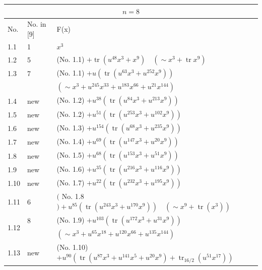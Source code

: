 \documentclass[10pt]{article}
\begin{document}
\begin{table}[h]
\begin{center}
\begin{tabular}{|l|l|l|}
\hline
\multicolumn{3}{|c|}{$n=8$} \\
\hline
No. & No. in [9] & F(x) \\
\hline
1.1 & 1 & $x^{3}$ \\
\hline
1.2 & 5 & (No. 1.1) $+\operatorname{tr}\left(u^{48} x^{3}+x^{9}\right) \quad\left(\sim x^{3}+\operatorname{tr} x^{9}\right)$ \\
\hline
1.3 & 7 & (No. 1.1) $+u\left(\operatorname{tr}\left(u^{63} x^{3}+u^{252} x^{9}\right)\right)$ \\
\hline
 &  & $\left(\sim x^{3}+u^{245} x^{33}+u^{183} x^{66}+u^{21} x^{144}\right)$ \\
\hline
1.4 & new & (No. 1.2) $+u^{38}\left(\operatorname{tr}\left(u^{84} x^{3}+u^{213} x^{9}\right)\right)$ \\
\hline
1.5 & new & (No. 1.2) $+u^{51}\left(\operatorname{tr}\left(u^{253} x^{3}+u^{102} x^{9}\right)\right)$ \\
\hline
1.6 & new & (No. 1.3) $+u^{154}\left(\operatorname{tr}\left(u^{68} x^{3}+u^{235} x^{9}\right)\right)$ \\
\hline
1.7 & new & (No. 1.4) $+u^{69}\left(\operatorname{tr}\left(u^{147} x^{3}+u^{20} x^{9}\right)\right)$ \\
\hline
1.8 & new & (No. 1.5) $+u^{68}\left(\operatorname{tr}\left(u^{153} x^{3}+u^{51} x^{9}\right)\right)$ \\
\hline
1.9 & new & (No. 1.6) $+u^{35}\left(\operatorname{tr}\left(u^{216} x^{3}+u^{116} x^{9}\right)\right)$ \\
\hline
1.10 & new & (No. 1.7) $+u^{22}\left(\operatorname{tr}\left(u^{232} x^{3}+u^{195} x^{9}\right)\right)$ \\
\hline
1.11 & 6 & $($ No. 1.8 $)+u^{85}\left(\operatorname{tr}\left(u^{243} x^{3}+u^{170} x^{9}\right)\right) \quad\left(\sim x^{9}+\operatorname{tr}\left(x^{3}\right)\right)$ \\
\hline
\multirow{2}{*}{1.12} & 8 & (No. 1.9) $+u^{103}\left(\operatorname{tr}\left(u^{172} x^{3}+u^{31} x^{9}\right)\right)$ \\
\hline
 &  & $\left(\sim x^{3}+u^{65} x^{18}+u^{120} x^{66}+u^{135} x^{144}\right)$ \\
\hline
1.13 & new & (No. 1.10) $+u^{90}\left(\operatorname{tr}\left(u^{87} x^{3}+u^{141} x^{5}+u^{20} x^{9}\right)+\right. \left.\operatorname{tr}_{16 / 2}\left(u^{51} x^{17}\right)\right)$ \\

\end{tabular}
\end{center}
\end{table}
\end{document}
